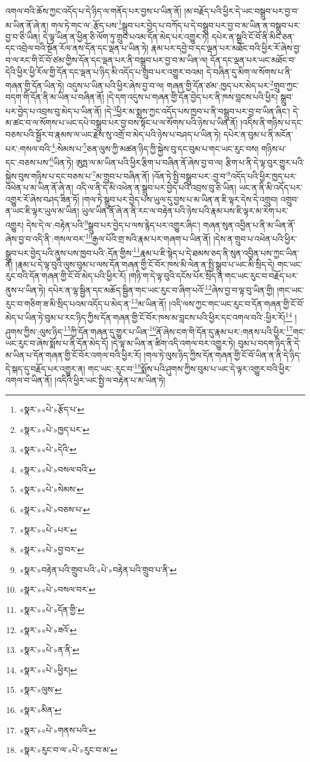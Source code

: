 འགལ་བའི་ཆོས་ཀྱང་འདོད་པ་དེ་ཉིད་ལ་གནོད་པར་བྱས་པ་ཡིན་ནོ། །མ་བརྗོད་པའི་ཕྱིར་དེ་ཡང་བསྒྲུབ་པར་བྱ་བ་མ་ཡིན་ནོ་ཞེ་ན། གལ་ཏེ་གང་ལ་:རྩོད་པས་\footnote{«སྣར་»«པེ་»རྩོད་པ་}སྒྲུབ་པར་བྱེད་པ་བཀོད་པ་དེ་བསྒྲུབ་པར་བྱ་བ་མ་ཡིན་ན་བསྒྲུབ་པར་བྱ་བ་ཅི་ཡིན། དེ་ལྟ་ཡིན་ན་ཕྱིན་ཅི་ལོག་ཏུ་གྲུབ་པའམ་དོན་མེད་པར་འགྱུར་ཏེ། དཔེར་ན་སྒྲའི་ངོ་བོ་ནི་མིང་ཅན་དང་འབྲེལ་བའི་སྔོན་རོལ་ནས་དོན་དང་ལྡན་པ་ཡིན་ཏེ། རྣམ་པར་དབྱེ་བ་དང་ལྡན་པར་མཐོང་བའི་ཕྱིར་རོ་ཞེས་བྱ་བ་ལ་རང་གི་ངོ་བོ་ཙམ་གྱིས་དོན་དང་ལྡན་པར་ནི་བསྒྲུབ་པར་བྱ་བ་མ་ཡིན་ལ། དོན་དང་ལྡན་པར་ཡང་མཐོང་བ་དེའི་ཕྱིར་ཕྱི་རོལ་གྱི་དོན་དང་ལྡན་པ་ཉིད་མི་འདོད་པ་གྲུབ་པར་འགྱུར་བའམ། དེ་བཞིན་དུ་མིག་ལ་སོགས་པ་ནི་གཞན་གྱི་དོན་ཡིན་ཏེ། འདུས་པ་ཡིན་པའི་ཕྱིར་ཞེས་བྱ་བ་ལ། གཞན་གྱི་དོན་ཙམ་:ཁྱད་པར་མེད་པར་\footnote{«སྣར་»«པེ་»ཁྱད་པར་}གྲུབ་ཀྱང་བདག་གི་དོན་ནི་མ་ཡིན་པ་བཞིན་ནོ། །དེ་དག་འདུས་པ་གཞན་གྱི་དོན་བྱེད་པར་ནི་ཁས་བླངས་པའི་ཕྱིར། སྒྲུབ་པར་བྱེད་པ་འབྲས་བུ་མེད་པ་ཡིན་ནོ། །དེ་\footnote{«སྣར་»«པེ་»དེའི་}ཕྱིར་མ་སྨྲས་ཀྱང་འདོད་པས་ཁྱབ་པ་ནི་བསྒྲུབ་པར་བྱ་བ་ཡིན་ཞིང་། དེ་མ་ཚང་བ་ལ་སོགས་པ་ཡང་དཔེ་བསྒྲུབ་པར་བྱ་བས་སྟོང་པ་ལ་སོགས་པའི་ཉེས་པ་ཡིན་ནོ། །འདིས་ནི་གཉིས་པ་དང་བཅས་པའི་སྦྱོར་བ་རྣམས་ལ་ཡང་རྗེས་སུ་འགྲོ་བ་མེད་པའི་ཉེས་པ་བཤད་པ་ཡིན་ཏེ། དཔེར་ན་བུམ་པ་ནི་མངོན་པར་:གསལ་བའི་\footnote{«སྣར་»«པེ་»བསལ་བའི་}:སེམས་པ་\footnote{«སྣར་»«པེ་»སེམས་}ཅན་ལུས་ཀྱི་མཚན་ཉིད་ཀྱི་སྐྱེས་བུ་དང་བུམ་པ་གང་ཡང་རུང་བས། གཉིས་པ་དང་:བཅས་པས་\footnote{«སྣར་»«པེ་»བཅས་པ་}ཡིན་ཏེ། ཨུཏྤ་ལ་མ་ཡིན་པའི་ཕྱིར་རྩིག་པ་བཞིན་ནོ་ཞེས་བྱ་བ་ལ། རྩིག་པ་ནི་དེ་ལྟ་བུར་གྱུར་པའི་སྐྱེས་བུས་གཉིས་པ་དང་བཅས་པ་\footnote{«སྣར་»«པེ་»པར་}མ་གྲུབ་པ་བཞིན་ནོ། །འོན་ཏེ་སྤྱི་བསྒྲུབ་པར་:བྱ་བ་\footnote{«སྣར་»«པེ་»བྱ་བར་}འདོད་པའི་ཕྱིར་ཁྱད་པར་འཕེན་པ་མ་ཡིན་ནོ་ཞེ་ན། འདི་ལ་ནི་དེ་མི་འཕེན་ན་སྒྲུབ་པར་བྱེད་པའི་འབྲས་བུ་ཅི་ཡིན། ཡང་ན་ནི་མི་འདོད་པར་འགྱུར་རོ་ཞེས་བཤད་ཟིན་ཏོ། །གལ་ཏེ་སྒྲུབ་པར་བྱེད་པས་ཡུལ་དུ་བྱས་པ་མ་ཡིན་ན་ཇི་ལྟར་དེས་དེ་འགྲུབ། འགྲུབ་ན་ཡང་ཇི་ལྟར་ཡུལ་མ་ཡིན། ཡུལ་ཡིན་ནོ་ཞེ་ན་ནི་རང་ལ་བརྟེན་པའི་ཉེས་པའི་རྣམ་པས་ཇི་ལྟར་མ་རེག་པར་འགྱུར། དེས་དེ་ལ་:བརྟེན་པའི་\footnote{«སྣར་»བརྟེན་པའི་གྲུབ་པའི་«པེ་»བརྟེན་པའི་གྲུབ་པ་ནི་}སྒྲུབ་པར་བྱེད་པ་ལས་རྙེད་པར་འགྱུར་ཞིང་། གཞན་སུན་འབྱིན་པ་ནི་མ་ཡིན་ནོ་ཞེས་བྱ་བ་འདི་ནི་:གསལ་བར་\footnote{«སྣར་»«པེ་»བསལ་བར་}རྒྱལ་པོའི་གྲ་སའི་རྣམ་པར་གཞག་པ་ཡིན་ནོ། །དེས་ན་གྲུབ་པ་འཕེན་པའི་ཕྱིར་སྒྲུབ་པར་བྱེད་པའི་ནུས་པས་ཁྱབ་པའི་:དོན་གྱིས་\footnote{«སྣར་»«པེ་»དོན་གྱི་}རྣམ་པ་ཇི་སྙེད་པ་དེ་ཐམས་ཅད་ནི་སུན་འབྱིན་པས་ཀྱང་ཡིན་ནོ། །རྣམ་པ་དེ་ལྟ་བུའི་ལུས་བུམ་པ་ལས་དོན་གཞན་གྱི་ངོ་བོར་ཁས་མི་ལེན་ན་སྤྱི་སྒྲུབ་པ་ཡང་མི་སྲིད་དེ། གང་ཡང་རུང་བའི་དོན་གཞན་གྱི་ངོ་བོ་མེད་པའི་ཕྱིར་རོ། །གཉི་ག་དེ་ལྟ་བུའི་དངོས་པོར་སྲིད་ན་གང་ཡང་རུང་བ་བརྗོད་པར་ནུས་པ་ཡིན་ཏེ། དཔེར་ན་ལྷ་སྦྱིན་དང་མཆོད་སྦྱིན་གང་ཡང་རུང་བ་ཞིག་པའོ་\footnote{«སྣར་»«པེ་»ཟའོ་}ཞེས་བྱ་བ་ལྟ་བུ་ཡིན་གྱི། །གང་ཡང་རུང་བ་གཅིག་ཟ་མི་སྲིད་པའམ་འདོད་པ་མེད་ན་\footnote{«སྣར་»«པེ་»ན་ནི་}མ་ཡིན་ནོ། །འདི་ལས་ཀྱང་གང་ཡང་རུང་བ་དོན་གཞན་གྱི་ངོ་བོ་མེད་པ་ཡིན་ཏེ་བུམ་པ་རང་ཉིད་ཀྱིས་དོན་གཞན་གྱི་ངོ་བོར་ཁས་མ་བླངས་པའི་ཕྱིར་དང་འགལ་བའི་:ཕྱིར་རོ།\footnote{«སྣར་»«པེ་»ཕྱིར།} །ཤུགས་ཀྱིས་:ལུས་ཉིད་\footnote{«སྣར་»ལུས་}ཀྱི་དོན་གཞན་དུ་གྱུར་པ་ཡིན་\footnote{«སྣར་»མིན་}ནོ་ཞེས་ངག་གི་དོན་དུ་རྣམ་པར་:གནས་པའི་ཕྱིར་\footnote{«སྣར་»«པེ་»གནས་པའི་}གང་ཡང་རུང་བ་ཞེས་སྨོས་པ་ནི་དོན་མེད་དོ། །དེ་ལྟ་མ་ཡིན་ན་ཚིག་འདི་འགལ་བར་འགྱུར་ཏེ། བུམ་པ་བདག་ཉིད་ནི་དེ་མ་ཡིན་པ་དོན་གཞན་གྱི་ངོ་བོར་འགལ་བའི་ཕྱིར་རོ། །གལ་ཏེ་ལུས་ཉིད་ཀྱིས་དོན་གཞན་གྱི་ངོ་བོ་ཡིན་ན་ནི་དེ་ཉིད་དེ་སྐད་དུ་བརྗོད་པར་འགྱུར་ན། གང་ཡང་:རུང་བ་\footnote{«སྣར་»རུང་བ་ལ་«པེ་»རུང་བ་མ་}སྨོས་པའི་ཤུགས་ཀྱིས་བུམ་པ་ཡང་དེ་ལྟར་འགྱུར་བའི་ཕྱིར་འགལ་བ་ཡིན་ནོ། །འདིའི་ཕྱིར་ཡང་སྤྱི་ལ་བརྟེན་པ་མ་ཡིན་ཏེ། 